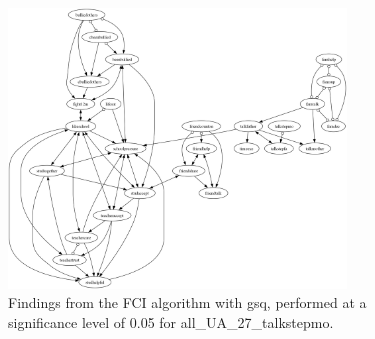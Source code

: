 \begin{figure}[htbp]
    \centering
    \includegraphics[width=0.8\textwidth]{Report/final_report/pictures/FCI_gsq_0.05_all_UA_27_talkstepmo.png}
    \caption{Findings from the FCI algorithm with gsq, performed at a significance level of 0.05 for all_UA_27_talkstepmo.}
    \label{fig:fci_gsq_0.05all_UA_27_talkstepmo}
\end{figure}

